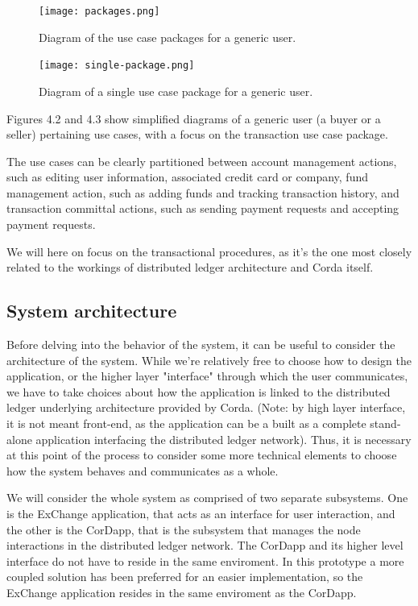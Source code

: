 \begin{figure}[h!]
    \centering
    \texttt{[image: packages.png]}
    \caption{
       Diagram of the use case packages for a generic user.
        }
\end{figure}

\begin{figure}[h!]
    \centering
    \texttt{[image: single-package.png]}
    \caption{
       Diagram of a single use case package for a generic user.
        }
\end{figure}

Figures 4.2 and 4.3 show simplified diagrams of a generic user (a buyer or a seller) pertaining use cases, with a focus on the transaction use case package.

The use cases can be clearly partitioned between account management actions, such as editing user information, associated credit card or company, fund management action, such as adding funds and tracking transaction history, and transaction committal actions, such as sending payment requests and accepting payment requests.

We will here on focus on the transactional procedures, as it's the one most closely related to the workings of distributed ledger architecture and Corda itself.

\newpage

\subsection{System architecture}

Before delving into the behavior of the system, it can be useful to consider the architecture of the system.
While we're relatively free to choose how to design the application, or the higher layer "interface" through which the user communicates, we have to take choices about how the application is linked to the distributed ledger underlying architecture provided by Corda. (Note: by high layer interface, it is not meant front-end, as the application can be a built as a complete stand-alone application interfacing the distributed ledger network).
Thus, it is necessary at this point of the process to consider some more technical elements to choose how the system behaves and communicates as a whole.

We will consider the whole system as comprised of two separate subsystems. One is the ExChange application, that acts as an interface for user interaction, and the other is the CorDapp, that is the subsystem that manages the node interactions in the distributed ledger network. 
The CorDapp and its higher level interface do not have to reside in the same enviroment. In this prototype a more coupled solution has been preferred for an easier implementation, so the ExChange application resides in the same enviroment as the CorDapp. 

